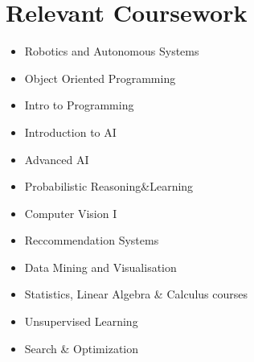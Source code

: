 \documentclass[letterpaper,11pt]{article}
\newcommand{\resumeSubHeadingListStart}{\begin{itemize}[leftmargin=0.0in, label={}]}
\newcommand{\resumeSubHeadingListEnd}{\end{itemize}}
\begin{document}
\section{Relevant Coursework}
        \begin{multicols}{2}
            \begin{itemize}[itemsep=-5pt, parsep=3pt]
                \item Robotics and Autonomous Systems
                \item Object Oriented Programming
                \item Intro to Programming
                \item Introduction to AI
                \item Advanced AI
                \item Probabilistic Reasoning\&Learning
                \item Computer Vision I
                \item Reccommendation Systems
                \item Data Mining and Visualisation
                \item Statistics, Linear Algebra \& Calculus courses
                \item Unsupervised Learning
                \item Search \& Optimization
            \end{itemize}
        \end{multicols}
        \vspace*{2.0\multicolsep}

    
\end{document}
